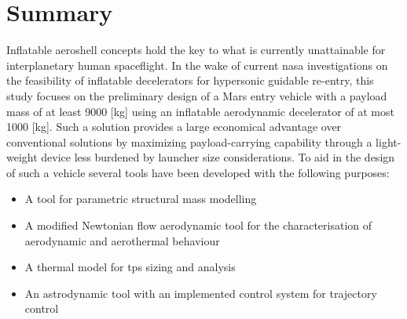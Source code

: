\section*{Summary}\label{cha:summary}
Inflatable aeroshell concepts hold the key to what is currently unattainable for interplanetary human spaceflight. In the wake of current \acrshort{nasa} investigations on the feasibility of inflatable decelerators for hypersonic guidable re-entry, this study focuses on the preliminary design of a Mars entry vehicle with a payload mass of at least 9000 [kg] using an inflatable aerodynamic decelerator of at most 1000 [kg]. Such a solution provides a large economical advantage over conventional solutions by maximizing payload-carrying capability through a light-weight device less burdened by launcher size considerations.
\newline
\newline
To aid in the design of such a vehicle several tools have been developed with the following purposes:

\begin{itemize}
\item A tool for parametric structural mass modelling
\item A modified Newtonian flow aerodynamic tool for the characterisation of aerodynamic and aerothermal behaviour
\item A thermal model for \acrfull{tps} sizing and analysis
\item An astrodynamic tool with an implemented control system for trajectory control
\end{itemize}

